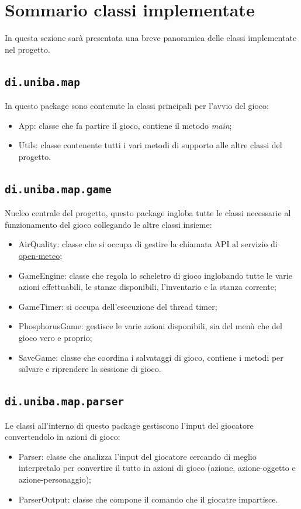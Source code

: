 \documentclass[italian,12pt,a4paper]{article}
\begin{document}
	\section{Sommario classi implementate}
	In questa sezione sarà presentata una breve panoramica delle classi implementate nel progetto.
	
	\subsection{\texttt{di.uniba.map}}
		In questo package sono contenute la classi principali per l'avvio del gioco:
		
		\begin{itemize}
			\item App: classe che fa partire il gioco, contiene il metodo \textit{main};
			\item Utils: classe contenente tutti i vari metodi di supporto alle altre classi del progetto.
		\end{itemize}
	
	\subsection{\texttt{di.uniba.map.game}}
		Nucleo centrale del progetto, questo package ingloba tutte le classi necessarie al funzionamento del gioco collegando le altre classi insieme:
		
		\begin{itemize}
			\item AirQuality: classe che si occupa di gestire la chiamata API al servizio di \href{https://open-meteo.com/en/docs/air-quality-api}{open-meteo};
			\item GameEngine: classe che regola lo scheletro di gioco inglobando tutte le varie azioni effettuabili, le stanze disponibili, l'inventario e la stanza corrente;
			\item GameTimer: si occupa dell'esecuzione del thread timer;
			\item PhosphorusGame: gestisce le varie azioni disponibili, sia del menù che del gioco vero e proprio;
			\item SaveGame: classe che coordina i salvataggi di gioco, contiene i metodi per salvare e riprendere la sessione di gioco.
		\end{itemize}
		
	
	\subsection{\texttt{di.uniba.map.parser}}
	Le classi all'interno di questo package gestiscono l'input del giocatore convertendolo in azioni di gioco:
	\begin{itemize}
		\item Parser: classe che analizza l'input del giocatore cercando di meglio interpretalo per convertire il tutto in azioni di gioco (azione, azione-oggetto e azione-personaggio);
		\item ParserOutput: classe che compone il comando che il giocatre impartisce.
	\end{itemize}
	
\end{document}
